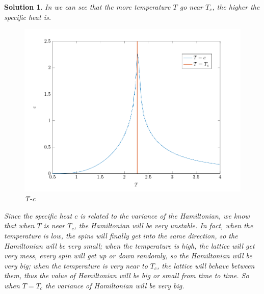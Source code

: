 \documentclass[11pt,openany]{book}              %
\newtheorem{solution}{Solution}
\begin{document}
\begin{solution}
	In  we can see that the more temperature \(T\) go near \(T_c\), the higher the specific heat is.
	\begin{figure}
		\centering
		\includegraphics[width=\linewidth]{figs/Tc.pdf}
		\caption{T-c}\label{fig:Tc}
	\end{figure}
	Since the specific heat \(c\) is related to the variance of the Hamiltonian, we know that when \(T\) is near \(T_c\), the Hamiltonian will be very unstable.
	In fact, when the temperature is low, the spins will finally get into the same direction, so the Hamiltonian will be very small;
	when the temperature is high, the lattice will get very mess, every spin will get up or down randomly, so the Hamiltonian will be very big;
	when the temperature is very near to \(T_c\), the lattice will behave between them, thus the value of Hamiltonian will be big or small from time to time.
	So when \(T=T_c\) the variance of Hamiltonian will be very big.

\end{solution}
\end{document}
